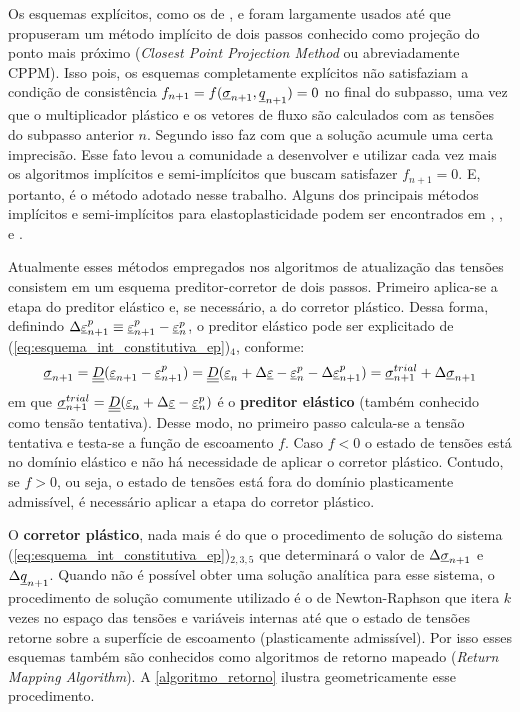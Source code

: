 Os esquemas explícitos, como os de ,  e  foram largamente usados até que  propuseram um método implícito de dois passos conhecido como projeção do ponto mais próximo (\textit{Closest Point Projection Method} ou abreviadamente CPPM). Isso pois, os esquemas completamente explícitos não satisfaziam a condição de consistência $f_{n+1} = f(\underline \sigma_{n+1},\underline q_{n+1}) = 0$ no final do subpasso, uma vez que o multiplicador plástico e os vetores de fluxo são calculados com as tensões do subpasso anterior $n$. Segundo  isso faz com que a solução acumule uma certa imprecisão. Esse fato levou a comunidade a desenvolver e utilizar cada vez mais os algoritmos implícitos e semi-implícitos que buscam satisfazer $f_{n+1} = 0$. E, portanto, é o método adotado nesse trabalho. Alguns dos principais métodos implícitos e semi-implícitos para elastoplasticidade podem ser encontrados em , ,  e .

Atualmente esses métodos empregados nos algoritmos de atualização das tensões consistem em um esquema preditor-corretor de dois passos. Primeiro aplica-se a etapa do preditor elástico e, se necessário, a do corretor plástico. Dessa forma, definindo $\Delta \underline{\varepsilon}_{n+1}^p \equiv \underline{\varepsilon}_{n+1}^p - \underline{\varepsilon}_{n}^p$, o preditor elástico pode ser explicitado de (\ref{eq:esquema_int_constitutiva_ep})$_4$, conforme:
\begin{equation}
	\label{eq:preditor_elastico}
	\underline \sigma_{n+1} = \underline{\underline D}(\underline{\varepsilon}_{n+1}-\underline{\varepsilon}_{n+1}^p) = \underline{\underline D}(\underline{\varepsilon}_n+\Delta \underline{\varepsilon}-\underline{\varepsilon}_{n}^ p-\Delta \underline{\varepsilon}_{n+1}^p) = \underline \sigma_{n+1}^{trial} + \Delta \underline \sigma_{n+1}
\end{equation}
em que $\underline \sigma_{n+1}^{trial} = \underline{\underline D}(\underline{\varepsilon}_n+\Delta \underline{\varepsilon}-\underline{\varepsilon}_{n}^ p)$ é o \textbf{preditor elástico} (também conhecido como tensão tentativa). Desse modo, no primeiro passo calcula-se a tensão tentativa e testa-se a função de escoamento $f$. Caso $f<0$ o estado de tensões está no domínio elástico e não há necessidade de aplicar o corretor plástico. Contudo, se $f>0$, ou seja, o estado de tensões está fora do domínio plasticamente admissível, é necessário aplicar a etapa do corretor plástico.

O \textbf{corretor plástico}, nada mais é do que o procedimento de solução do sistema (\ref{eq:esquema_int_constitutiva_ep})$_{2,3,5}$ que determinará o valor de $\Delta \underline \sigma_{n+1}$ e $\Delta \underline q_{n+1}$. Quando não é possível obter uma solução analítica para esse sistema, o procedimento de solução comumente utilizado é o de Newton-Raphson que itera $k$ vezes no espaço das tensões e variáveis internas até que o estado de tensões retorne sobre a superfície de escoamento (plasticamente admissível). Por isso esses esquemas também são conhecidos como algoritmos de retorno mapeado (\textit{Return Mapping Algorithm}). A \autoref{algoritmo_retorno} ilustra geometricamente esse procedimento.

